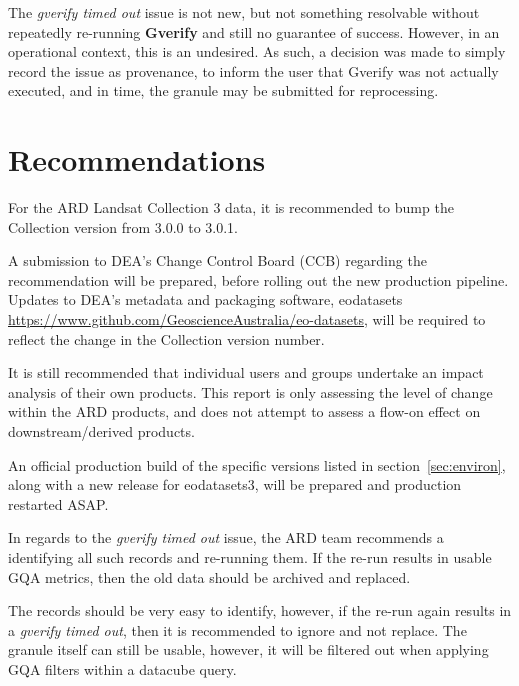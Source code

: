 \documentclass[a4paper]{article}
\begin{document}
    \begin{flushleft}
      The \textit{gverify timed out} issue is not new, but not something resolvable without repeatedly re-running \textbf{Gverify} and still no guarantee of success. However, in an operational context, this is an undesired. As such, a decision was made to simply record the issue as provenance, to inform the user that Gverify was not actually executed, and in time, the granule may be submitted for reprocessing.
    \end{flushleft}

  \section{Recommendations}

    \begin{flushleft}
      For the ARD Landsat Collection 3 data, it is recommended to bump the Collection version from 3.0.0 to 3.0.1. \par
      A submission to DEA's Change Control Board (CCB) regarding the recommendation will be prepared, before rolling out the new production pipeline. Updates to DEA's metadata and packaging software, eodatasets \url{https://www.github.com/GeoscienceAustralia/eo-datasets}, will be required to reflect the change in the Collection version number. \par
      It is still recommended that individual users and groups undertake an impact analysis of their own products. This report is only assessing the level of change within the ARD products, and does not attempt to assess a flow-on effect on downstream/derived products. \par
      An official production build of the specific versions listed in section~\ref{sec:environ}, along with a new release for eodatasets3, will be prepared and production restarted ASAP.
    \end{flushleft}

    \begin{flushleft}
      In regards to the \textit{gverify timed out} issue, the ARD team recommends a identifying all such records and re-running them. If the re-run results in usable GQA metrics, then the old data should be archived and replaced. \par
      The records should be very easy to identify, however, if the re-run again results in a \textit{gverify timed out}, then it is recommended to ignore and not replace. The granule itself can still be usable, however, it will be filtered out when applying GQA filters within a datacube query.
    \end{flushleft}
\end{document}
